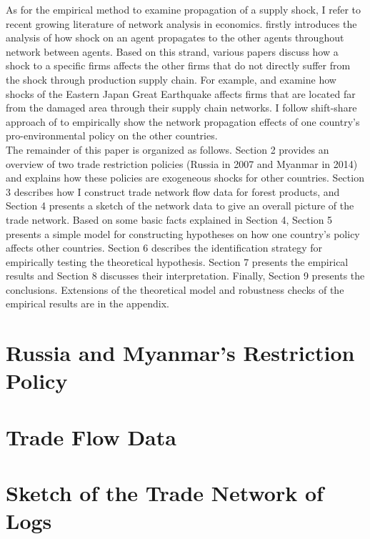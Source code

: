 \documentclass[a4paper,12pt]{article}
\begin{document}
As for the empirical method to examine propagation of a supply shock, I refer to recent growing literature of network analysis in economics. \cite{acemoglu2012network} firstly introduces the analysis of how shock on an agent propagates to the other agents throughout network between agents. Based on this strand, various papers discuss how a shock to a specific firms affects the other firms that do not directly suffer from the shock through production supply chain. For example, \cite{barrot2016input} and \cite{carvalho2021supply} examine how shocks of the Eastern Japan Great Earthquake affects firms that are located far from the damaged area through their supply chain networks. I follow shift-share approach of \cite{huneeus2018production} to empirically show the network propagation effects of one country's pro-environmental policy on the other countries.\\

The remainder of this paper is organized as follows. Section 2 provides an overview of two trade restriction policies (Russia in 2007 and Myanmar in 2014) and explains how these policies are exogeneous shocks for other countries. Section 3 describes how I construct trade network flow data for forest products, and Section 4 presents a sketch of the network data to give an overall picture of the trade network. Based on some basic facts explained in Section 4, Section 5 presents a simple model for constructing hypotheses on how one country's policy affects other countries. Section 6 describes the identification strategy for empirically testing the theoretical hypothesis. Section 7 presents the empirical results and Section 8 discusses their interpretation. Finally, Section 9 presents the conclusions. Extensions of the theoretical model and robustness checks of the empirical results are in the appendix.\\

\section{Russia and Myanmar's Restriction Policy}

\section{Trade Flow Data}

\section{Sketch of the Trade Network of Logs}
\end{document}
